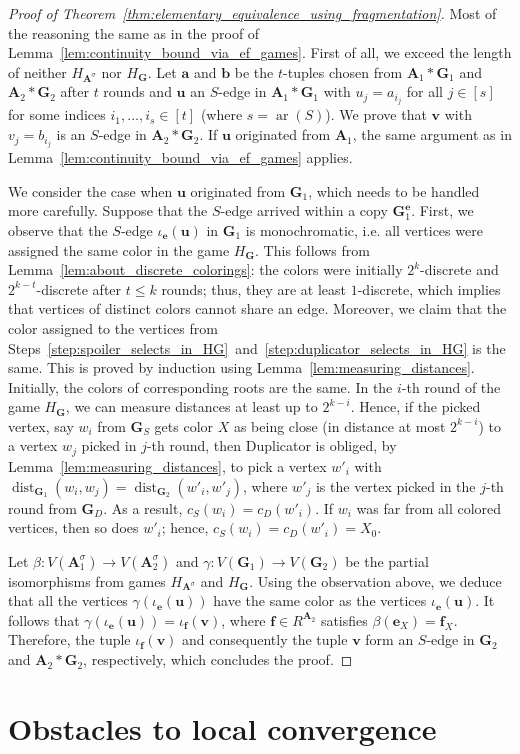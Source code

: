 \documentclass[11pt]{article}
\theoremstyle{plain}
\theoremstyle{definition}
\theoremstyle{remark}
\DeclareMathOperator\dist{dist}
\DeclareMathOperator\aritysym{ar}
\newcommand{\arity}[1]{{\aritysym({#1})}}
\newcommand{\str}[1]{\mathbf{#1}}
\newcommand{\tpl}[1]{{\bm{#1}}}
\begin{document}
\begin{proof}[Proof of Theorem~\ref{thm:elementary_equivalence_using_fragmentation}]
Most of the reasoning the same as in the proof of Lemma~\ref{lem:continuity_bound_via_ef_games}.
First of all, we exceed the length of neither $H_{\str{A}^\sigma}$ nor $H_\str{G}$.
Let $\tpl{a}$ and $\tpl{b}$ be the $t$-tuples chosen from $\str{A}_1*\str{G}_1$ and $\str{A}_2*\str{G}_2$ after $t$ rounds and $\tpl{u}$ an $S$-edge in $\str{A}_1*\str{G}_1$ with $u_j = a_{i_j}$ for all $j \in [s]$ for some indices $i_1, \dots, i_s \in [t]$ (where $s = \arity{S}$).
We prove that $\tpl{v}$ with $v_j = b_{i_j}$ is an $S$-edge in $\str{A}_2*\str{G}_2$.
If $\tpl{u}$ originated from $\str{A}_1$, the same argument as in Lemma~\ref{lem:continuity_bound_via_ef_games} applies.

We consider the case when $\tpl{u}$ originated from $\str{G}_1$, which needs to be handled more carefully.
Suppose that the $S$-edge arrived within a copy $\str{G}_1^\tpl{e}$.
First, we observe that the $S$-edge $\iota_\tpl{e}(\tpl{u})$ in $\str{G}_1$ is monochromatic, i.e. all vertices were assigned the same color in the game $H_\str{G}$.
This follows from Lemma~\ref{lem:about_discrete_colorings}: the colors were initially $2^k$-discrete and $2^{k-t}$-discrete after $t \leq k$ rounds; thus, they are at least $1$-discrete, which implies that vertices of distinct colors cannot share an edge.
Moreover, we claim that the color assigned to the vertices from Steps~\ref{step:spoiler_selects_in_HG}~and~\ref{step:duplicator_selects_in_HG} is the same.
This is proved by induction using Lemma~\ref{lem:measuring_distances}.
Initially, the colors of corresponding roots are the same.
In the $i$-th round of the game $H_\str{G}$, we can measure distances at least up to $2^{k-i}$.
Hence, if the picked vertex, say $w_i$ from $\str{G}_S$ gets color $X$ as being close (in distance at most $2^{k-i}$) to a vertex $w_j$ picked in $j$-th round, then Duplicator is obliged, by Lemma~\ref{lem:measuring_distances}, to pick a vertex $w'_i$ with $\dist_{\str{G}_1}(w_i, w_j) = \dist_{\str{G}_2}(w'_i, w'_j)$, where $w'_j$ is the vertex picked in the $j$-th round from $\str{G}_D$.
As a result, $c_S(w_i) = c_D(w'_i)$.
If $w_i$ was far from all colored vertices, then so does $w'_i$; hence, $c_S(w_i) = c_D(w'_i) = X_0$.

Let $\beta: V(\str{A}_1^\sigma) \to V(\str{A}_2^\sigma)$ and $\gamma: V(\str{G}_1) \to V(\str{G}_2)$ be the partial isomorphisms from games $H_{\str{A}^\sigma}$ and $H_\str{G}$.
Using the observation above, we deduce that all the vertices $\gamma(\iota_\tpl{e}(\tpl{u}))$ have the same color as the vertices $\iota_\tpl{e}(\tpl{u})$.
It follows that $\gamma(\iota_\tpl{e}(\tpl{u})) = \iota_\tpl{f}(\tpl{v})$, where $\tpl{f} \in R^{\str{A}_2}$ satisfies $\beta(\tpl{e}_X) = \tpl{f}_X$.
Therefore, the tuple $\iota_\tpl{f}(\tpl{v})$ and consequently the tuple $\tpl{v}$ form an $S$-edge in $\str{G}_2$ and $\str{A}_2 * \str{G}_2$, respectively, which concludes the proof.
\end{proof} \section{Obstacles to local convergence}\label{sec:obstacles}
\end{document}

